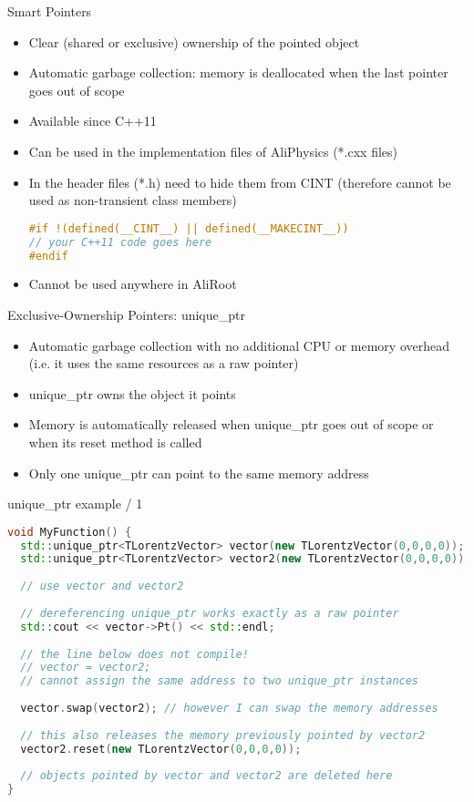 \documentclass[xcolor={usenames,dvipsnames}]{beamer}
\begin{document}
\begin{frame}[fragile]{Smart Pointers}
\begin{itemize}
\item Clear (shared or exclusive) ownership of the pointed object
\item Automatic garbage collection: memory is deallocated when the last pointer goes out of scope
\item Available since C++11
\item Can be used in the implementation files of AliPhysics (*.cxx files)
\item In the header files (*.h) need to hide them from CINT (therefore cannot be used as non-transient class members) \\
{\scriptsize
\begin{lstlisting}[language=C++]
#if !(defined(__CINT__) || defined(__MAKECINT__))
// your C++11 code goes here
#endif
\end{lstlisting}
}
\item Cannot be used anywhere in AliRoot
\end{itemize}
\end{frame}

\begin{frame}[fragile]{Exclusive-Ownership Pointers: unique\_ptr}
\begin{itemize}
\item Automatic garbage collection with no additional CPU or memory overhead (i.e. it uses the same resources as a raw pointer)
\item unique\_ptr owns the object it points
\item Memory is automatically released when unique\_ptr goes out of scope or when its reset method is called
\item Only one unique\_ptr can point to the same memory address
\end{itemize}
\end{frame}

\begin{frame}[fragile]{unique\_ptr example / 1}
\scriptsize
\begin{lstlisting}[language=C++]
void MyFunction() {
  std::unique_ptr<TLorentzVector> vector(new TLorentzVector(0,0,0,0));
  std::unique_ptr<TLorentzVector> vector2(new TLorentzVector(0,0,0,0));
  
  // use vector and vector2
  
  // dereferencing unique_ptr works exactly as a raw pointer
  std::cout << vector->Pt() << std::endl;
  
  // the line below does not compile!
  // vector = vector2;
  // cannot assign the same address to two unique_ptr instances
  
  vector.swap(vector2); // however I can swap the memory addresses
  
  // this also releases the memory previously pointed by vector2
  vector2.reset(new TLorentzVector(0,0,0,0)); 
  
  // objects pointed by vector and vector2 are deleted here
}
\end{lstlisting}
\end{frame}
\end{document}
